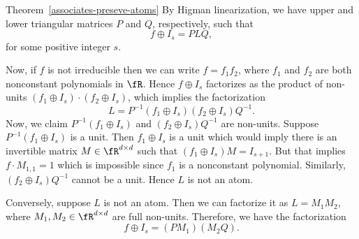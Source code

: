 \begin{proofof}{Theorem~\ref{associates-preseve-atoms}}
By Higman linearization, we have upper and lower triangular matrices
$P$ and $Q$, respectively, such that
\[
f\oplus I_s = PLQ,
\]
for some positive integer $s$.

Now, if $f$ is not irreducible then we can write $f=f_1f_2$, where
$f_1$ and $f_2$ are both nonconstant polynomials in $\fR$. Hence
$f\oplus I_s$ factorizes as the product of non-units $(f_1\oplus
I_s)\cdot (f_2\oplus I_s)$, which implies the factorization
\[
L = P^{-1}(f_1\oplus I_s)(f_2\oplus I_s)Q^{-1}.
\]
Now, we claim $P^{-1}(f_1\oplus I_s)$ and $(f_2\oplus I_s)Q^{-1}$ are
non-units. Suppose $P^{-1}(f_1\oplus I_s)$ is a unit. Then $f_1\oplus
I_s$ is a unit which would imply there is an invertible matrix
$M\in\fR^{d\times d}$ such that $(f_1\oplus I_s)M=I_{s+1}$. But that
implies $f\cdot M_{1,1}=1$ which is impossible since $f_1$ is a
nonconstant polynomial. Similarly, $(f_2\oplus I_s)Q^{-1}$ cannot be a
unit. Hence $L$ is not an atom.

Conversely, suppose $L$ is not an atom. Then we can factorize it as
$L=M_1M_2$, where $M_1,M_2\in \fR^{d\times d}$ are
full non-units. Therefore, we have the factorization
\[
f\oplus I_s = (PM_1)(M_2Q).
\]


\end{proofof}
